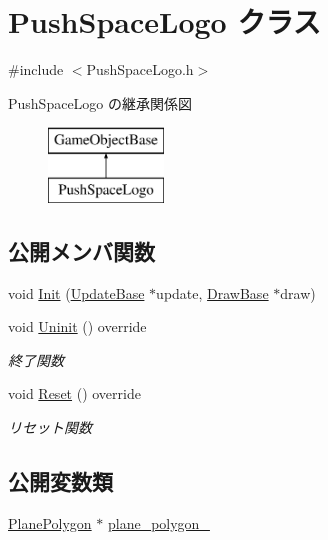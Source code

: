 \hypertarget{class_push_space_logo}{}\section{Push\+Space\+Logo クラス}
\label{class_push_space_logo}


{\ttfamily \#include $<$Push\+Space\+Logo.\+h$>$}

Push\+Space\+Logo の継承関係図\begin{figure}[H]
\begin{center}
\leavevmode
\includegraphics[height=2.000000cm]{class_push_space_logo}
\end{center}
\end{figure}
\subsection*{公開メンバ関数}
\begin{DoxyCompactItemize}
\item 
void \mbox{\hyperlink{class_push_space_logo_a381d34d0dfdd493eb46f299d2a2ba858}{Init}} (\mbox{\hyperlink{class_update_base}{Update\+Base}} $\ast$update, \mbox{\hyperlink{class_draw_base}{Draw\+Base}} $\ast$draw)
\item 
void \mbox{\hyperlink{class_push_space_logo_a06404113db417c58941ca7a13bba161e}{Uninit}} () override
\begin{DoxyCompactList}\small\item\em 終了関数 \end{DoxyCompactList}\item 
void \mbox{\hyperlink{class_push_space_logo_afa163b1aff8df494b4f09f378bf983f0}{Reset}} () override
\begin{DoxyCompactList}\small\item\em リセット関数 \end{DoxyCompactList}\end{DoxyCompactItemize}
\subsection*{公開変数類}
\begin{DoxyCompactItemize}
\item 
\mbox{\hyperlink{class_plane_polygon}{Plane\+Polygon}} $\ast$ \mbox{\hyperlink{class_push_space_logo_ab35a4cee269c3ba0b709a8951ccc3d42}{plane\+\_\+polygon\+\_\+}}
\end{DoxyCompactItemize}
